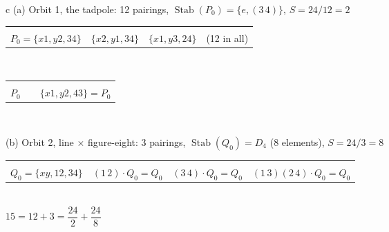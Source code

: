 \begin{tabular}{c}
{\small (a) Orbit 1, the tadpole: 12 pairings, $\operatorname{Stab}(P_0) = \{e, (3\,4)\}$, $S = 24/12 = 2$}\\[4pt]
\begin{tabular}{cccc}
\tadpole{1}{2}{3}{4} & \tadpole{2}{1}{3}{4} & \tadpole{1}{3}{2}{4} & \raisebox{4pt}{$\cdots$}\\[2pt]
{\small $P_0 = \{x1, y2, 34\}$} & {\small $\{x2, y1, 34\}$} & {\small $\{x1, y3, 24\}$} & {\small (12 in all)}
\end{tabular}\\[10pt]
\begin{tabular}{ccc}
\tadpole{1}{2}{3}{4} & \raisebox{6pt}{$\xrightarrow{\;(3\,4)\;}$} & \tadpole{1}{2}{4}{3}\\[2pt]
{\small $P_0$} & & {\small $\{x1, y2, 43\} = P_0$}
\end{tabular}\\[22pt]
\rule{0pt}{22pt}{\small (b) Orbit 2, line $\times$ figure-eight: 3 pairings, $\operatorname{Stab}(Q_0) = D_4$ (8 elements), $S = 24/3 = 8$}\\[4pt]
\setlength{\tabcolsep}{14pt}
\begin{tabular}{cccc}
\feight{1}{2}{3}{4} & \feight{2}{1}{3}{4} & \feight{1}{2}{4}{3} & \feight{3}{4}{1}{2}\\[2pt]
{\small $Q_0 = \{xy, 12, 34\}$} & {\small $(1\,2)\cdot Q_0 = Q_0$} & {\small $(3\,4)\cdot Q_0 = Q_0$} & {\small $(1\,3)(2\,4)\cdot Q_0 = Q_0$}
\end{tabular}\\[8pt]
{\small $15 = 12 + 3 = \dfrac{24}{2} + \dfrac{24}{8}$}
\end{tabular}

